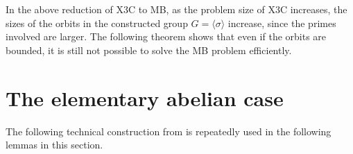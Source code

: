 In the above reduction of X3C to MB, as the problem size of X3C increases, the sizes of the orbits in the constructed group $G = \langle \sigma \rangle$ increase, since the primes involved are larger. The following theorem shows that even if the orbits are bounded, it is still not possible to solve the MB problem efficiently.

\section{The elementary abelian case}

The following technical construction from \cite{blaha1992} is repeatedly used in the following lemmas in this section. 

